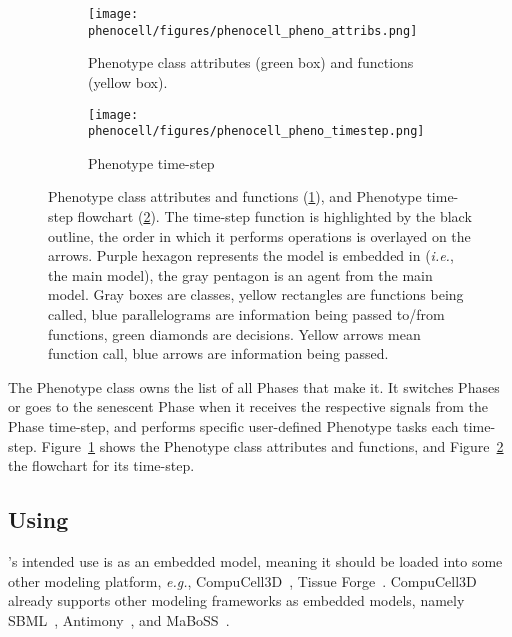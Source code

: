 \begin{figure}[!htpb]
    \centering
    \begin{subfigure}{.7\textwidth}
        \texttt{[image: phenocell/figures/phenocell\_pheno\_attribs.png]}
        \caption{Phenotype class attributes (green box) and functions (yellow box).}\label{fig:schematics-pheno:attr-ops}
    \end{subfigure}
    \begin{subfigure}{.7\textwidth}
        \texttt{[image: phenocell/figures/phenocell\_pheno\_timestep.png]}
        \caption{Phenotype time-step}\label{fig:schematics-pheno:time}
    \end{subfigure}
    \caption{Phenotype class attributes and functions (\ref{fig:schematics-pheno:attr-ops}), and Phenotype time-step flowchart (\ref{fig:schematics-pheno:time}). The time-step function is highlighted by the black outline, the order in which it performs operations is overlayed on the arrows. Purple hexagon represents the model \pcps is embedded in (\textit{i.e.}, the main model), the gray pentagon is an agent from the main model. Gray boxes are \pcps classes, yellow rectangles are functions being called, blue parallelograms are information being passed to/from functions, green diamonds are decisions. Yellow arrows mean function call, blue arrows are information being passed.}
    \label{fig:schematics-pheno}
\end{figure}

The Phenotype class owns the list of all Phases that make it. It switches Phases or goes to the senescent Phase when it receives the respective signals from the Phase time-step, and performs specific user-defined Phenotype tasks each time-step. Figure~\ref{fig:schematics-pheno:attr-ops} shows the Phenotype class attributes and functions, and Figure~\ref{fig:schematics-pheno:time} the flowchart for its time-step.



\subsection{Using \pcp}\label{sec:meth:how-to-use}
\pcp's intended use is as an embedded model, meaning it should be loaded into some other modeling platform, \textit{e.g.}, CompuCell3D~\cite{swat_multi-scale_2012}, Tissue Forge~\cite{sego_tissue_2022}. CompuCell3D already supports other modeling frameworks as embedded models, namely SBML~\cite{hucka_systems_2003}, Antimony~\cite{smith_antimony_2009}, and MaBoSS~\cite{stoll_maboss_2017}. 


